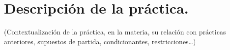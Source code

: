 \section{Descripción de la práctica.}
\paragraph*{}
(Contextualización de la práctica, en la materia, su relación con prácticas anteriores, supuestos de partida, condicionantes, restricciones…)